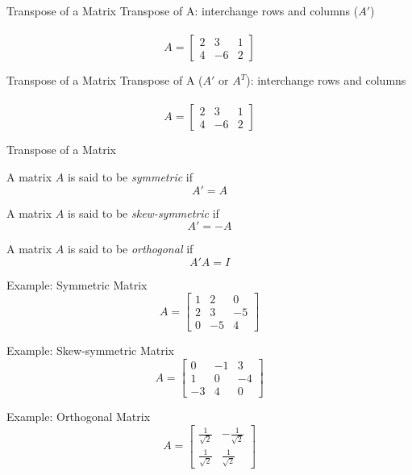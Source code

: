 \documentclass{./../../Latex/teaching_slides}
\begin{document}
\begin{frame}{Transpose of a Matrix}
Transpose of A: interchange rows and columns ($A'$) \\~\\
$$A = \begin{bmatrix}
2 & 3 & 1 \\
4 & -6 & 2
\end{bmatrix}$$
\end{frame}

\begin{frame}{Transpose of a Matrix}
Transpose of A  ($A'$ or $A^T$): interchange rows and columns \\~\\
$$A = \begin{bmatrix}
2 & 3 & 1 \\
4 & -6 & 2
\end{bmatrix}$$
\end{frame}

\begin{frame}{Transpose of a Matrix}
\begin{witemize}
\item A matrix $A$ is said to be \textit{symmetric} if $$A'=A$$
\item A matrix $A$ is said to be \textit{skew-symmetric} if $$A'=-A$$
\item A matrix $A$ is said to be \textit{orthogonal} if $$A'A=I$$
\end{witemize}
\end{frame}

\begin{frame}{Example: Symmetric Matrix}
$$
A=\left[\begin{array}{rrr}
1 & 2 & 0 \\
2 & 3 & -5 \\
0 & -5 & 4
\end{array}\right]
$$
\end{frame}

\begin{frame}{Example: Skew-symmetric Matrix}
$$
A=\left[\begin{array}{ccc}0 & -1 & 3 \\ 1 & 0 & -4 \\ -3 & 4 & 0\end{array}\right] 
$$
\end{frame}

\begin{frame}{Example: Orthogonal Matrix}
$$
A=\left[\begin{array}{cc}
\frac{1}{\sqrt{2}} & -\frac{1}{\sqrt{2}} \\
\frac{1}{\sqrt{2}} & \frac{1}{\sqrt{2}}
\end{array}\right]
$$
\end{frame}
\end{document}
